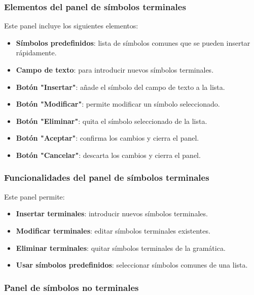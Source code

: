 \subsubsection{Elementos del panel de símbolos terminales}

Este panel incluye los siguientes elementos:

\begin{itemize}
    \item \textbf{Símbolos predefinidos}: lista de símbolos comunes que se pueden insertar rápidamente.
    \item \textbf{Campo de texto}: para introducir nuevos símbolos terminales.
    \item \textbf{Botón \string"Insertar\string"}: añade el símbolo del campo de texto a la lista.
    \item \textbf{Botón \string"Modificar\string"}: permite modificar un símbolo seleccionado.
    \item \textbf{Botón \string"Eliminar\string"}: quita el símbolo seleccionado de la lista.
    \item \textbf{Botón \string"Aceptar\string"}: confirma los cambios y cierra el panel.
    \item \textbf{Botón \string"Cancelar\string"}: descarta los cambios y cierra el panel.
\end{itemize}

\subsubsection{Funcionalidades del panel de símbolos terminales}

Este panel permite:
\begin{itemize}
    \item \textbf{Insertar terminales}: introducir nuevos símbolos terminales.
    \item \textbf{Modificar terminales}: editar símbolos terminales existentes.
    \item \textbf{Eliminar terminales}: quitar símbolos terminales de la gramática.
    \item \textbf{Usar símbolos predefinidos}: seleccionar símbolos comunes de una lista.
\end{itemize}

\subsubsection{Panel de símbolos no terminales}

